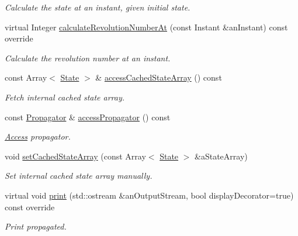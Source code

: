 \begin{DoxyCompactItemize}
\begin{DoxyCompactList}\small\item\em Calculate the state at an instant, given initial state. \end{DoxyCompactList}\item 
virtual Integer \hyperlink{classostk_1_1astro_1_1trajectory_1_1orbit_1_1models_1_1_propagated_a6360392c65494aa42aadff58ec58e49c}{calculate\+Revolution\+Number\+At} (const Instant \&an\+Instant) const override
\begin{DoxyCompactList}\small\item\em Calculate the revolution number at an instant. \end{DoxyCompactList}\item 
const Array$<$ \hyperlink{classostk_1_1astro_1_1trajectory_1_1_state}{State} $>$ \& \hyperlink{classostk_1_1astro_1_1trajectory_1_1orbit_1_1models_1_1_propagated_ab13c196dcea01238b6e1997cb46ced2b}{access\+Cached\+State\+Array} () const
\begin{DoxyCompactList}\small\item\em Fetch internal cached state array. \end{DoxyCompactList}\item 
const \hyperlink{classostk_1_1astro_1_1trajectory_1_1_propagator}{Propagator} \& \hyperlink{classostk_1_1astro_1_1trajectory_1_1orbit_1_1models_1_1_propagated_aabd25012cfd543722032f5bab8c0a3a3}{access\+Propagator} () const
\begin{DoxyCompactList}\small\item\em \hyperlink{classostk_1_1astro_1_1_access}{Access} propagator. \end{DoxyCompactList}\item 
void \hyperlink{classostk_1_1astro_1_1trajectory_1_1orbit_1_1models_1_1_propagated_a42c39258f14a74520c99bb5477a521df}{set\+Cached\+State\+Array} (const Array$<$ \hyperlink{classostk_1_1astro_1_1trajectory_1_1_state}{State} $>$ \&a\+State\+Array)
\begin{DoxyCompactList}\small\item\em Set internal cached state array manually. \end{DoxyCompactList}\item 
virtual void \hyperlink{classostk_1_1astro_1_1trajectory_1_1orbit_1_1models_1_1_propagated_a2b8aa6ff5511dbe92e6a3e7f4dd6880b}{print} (std\+::ostream \&an\+Output\+Stream, bool display\+Decorator=true) const override
\begin{DoxyCompactList}\small\item\em Print propagated. \end{DoxyCompactList}\end{DoxyCompactItemize}
